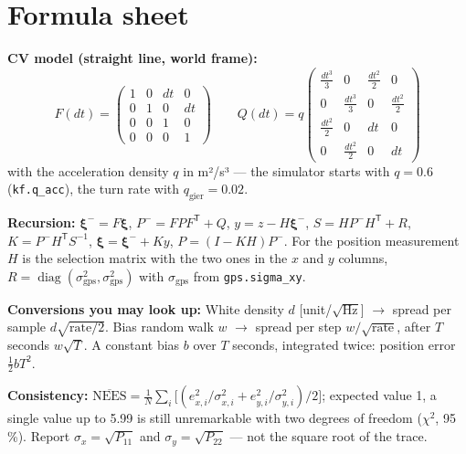 \documentclass[12pt,a4paper]{scrartcl}
\newcommand{\thema}[1]{\texttt{#1}}
\begin{document}
\appendix
\section{Formula sheet}\label{sec:formeln}
\textbf{CV model (straight line, world frame):}
\[
  F(dt)=\begin{pmatrix}1&0&dt&0\\0&1&0&dt\\0&0&1&0\\0&0&0&1\end{pmatrix}\qquad
  Q(dt)=q\!\begin{pmatrix}\tfrac{dt^3}{3}&0&\tfrac{dt^2}{2}&0\\[2pt]
        0&\tfrac{dt^3}{3}&0&\tfrac{dt^2}{2}\\[2pt]
        \tfrac{dt^2}{2}&0&dt&0\\[2pt]0&\tfrac{dt^2}{2}&0&dt\end{pmatrix}
\]
with the acceleration density \(q\) in m²/s³ — the simulator starts with
\(q=0.6\) (\thema{kf.q\_acc}), the turn rate with \(q_{\text{gier}}=0.02\).

\textbf{Recursion:}
\(\boldsymbol\xi^{-}=F\boldsymbol\xi\), \(P^{-}=FPF^{\mathsf T}+Q\),
\(y=z-H\boldsymbol\xi^{-}\), \(S=HP^{-}H^{\mathsf T}+R\),
\(K=P^{-}H^{\mathsf T}S^{-1}\), \(\boldsymbol\xi=\boldsymbol\xi^{-}+Ky\),
\(P=(I-KH)P^{-}\). For the position measurement \(H\) is the selection matrix with the two
ones in the \(x\) and \(y\) columns, \(R=\operatorname{diag}(\sigma_{\text{gps}}^2,
\sigma_{\text{gps}}^2)\) with \(\sigma_{\text{gps}}\) from \thema{gps.sigma\_xy}.

\textbf{Conversions you may look up:}
White density \(d\) [unit/\(\sqrt{\text{Hz}}\)] \(\to\) spread per sample
\(d\sqrt{\text{rate}/2}\). Bias random walk \(w\) \(\to\) spread per step
\(w/\sqrt{\text{rate}}\), after \(T\) seconds \(w\sqrt{T}\). A constant bias \(b\) over \(T\)
seconds, integrated twice: position error \(\tfrac{1}{2}bT^2\).

\textbf{Consistency:}
\(\overline{\text{NEES}}=\frac{1}{N}\sum_i\big[(e_{x,i}^2/\sigma_{x,i}^2
  + e_{y,i}^2/\sigma_{y,i}^2)\big/2\big]\);
expected value 1, a single value up to 5.99 is still unremarkable with two degrees of freedom
(\(\chi^2\), 95\,\%). Report \(\sigma_x=\sqrt{P_{11}}\) and
\(\sigma_y=\sqrt{P_{22}}\) — not the square root of the trace.
\end{document}
